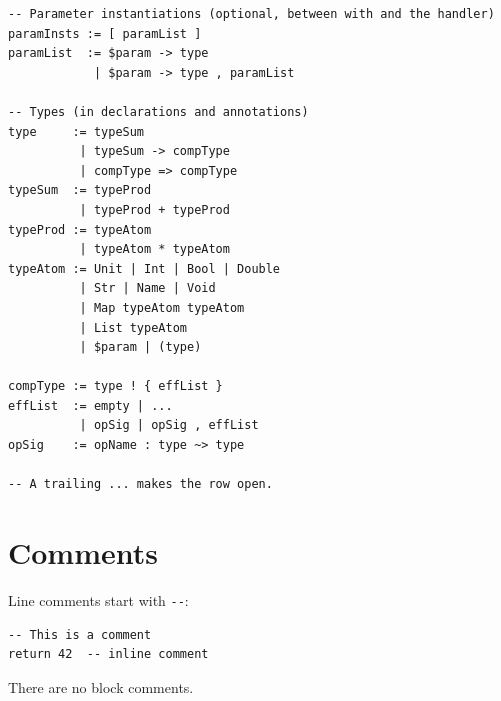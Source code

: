 \documentclass[11pt,a4paper]{article}
\begin{document}
\begin{lstlisting}[language={},basicstyle=\ttfamily\small,backgroundcolor=\color{cbaBg},frame=single,rulecolor=\color{cbaFrame},framesep=6pt,xleftmargin=8pt,xrightmargin=8pt,keywordstyle={},commentstyle={}]
-- Parameter instantiations (optional, between with and the handler)
paramInsts := [ paramList ]
paramList  := $param -> type
            | $param -> type , paramList

-- Types (in declarations and annotations)
type     := typeSum
          | typeSum -> compType
          | compType => compType
typeSum  := typeProd
          | typeProd + typeProd
typeProd := typeAtom
          | typeAtom * typeAtom
typeAtom := Unit | Int | Bool | Double
          | Str | Name | Void
          | Map typeAtom typeAtom
          | List typeAtom
          | $param | (type)

compType := type ! { effList }
effList  := empty | ...
          | opSig | opSig , effList
opSig    := opName : type ~> type

-- A trailing ... makes the row open.
\end{lstlisting}

\section{Comments}
\label{sec:comments}

Line comments start with \texttt{-{}-}:

\begin{lstlisting}
-- This is a comment
return 42  -- inline comment
\end{lstlisting}

There are no block comments.
\end{document}
